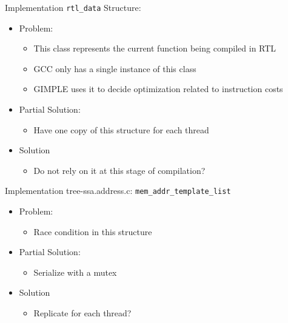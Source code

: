 \begin{frame}{Implementation}
    \texttt{rtl\_data} Structure: 
    \begin{itemize}
        \item Problem: 
            \begin{itemize}
                \item This class represents the current function being compiled in RTL
                \item GCC only has a single instance of this class
                \item GIMPLE uses it to decide optimization related to instruction costs
            \end{itemize}
        \item Partial Solution:
            \begin{itemize}
                \item Have one copy of this structure for each thread 
            \end{itemize}
        \item Solution 
            \begin{itemize}
                \item Do not rely on it at this stage of compilation? 
            \end{itemize}
    \end{itemize}
\end{frame}

\begin{frame}{Implementation}
    tree-ssa.address.c: \texttt{mem\_addr\_template\_list} 

    \begin{itemize}
        \item Problem:
            \begin{itemize}
                \item Race condition in this structure
            \end{itemize}
        \item Partial Solution:
            \begin{itemize}
                \item Serialize with a mutex
            \end{itemize}
        \item Solution 
            \begin{itemize}
                \item Replicate for each thread?
            \end{itemize}
    \end{itemize}

\end{frame}

